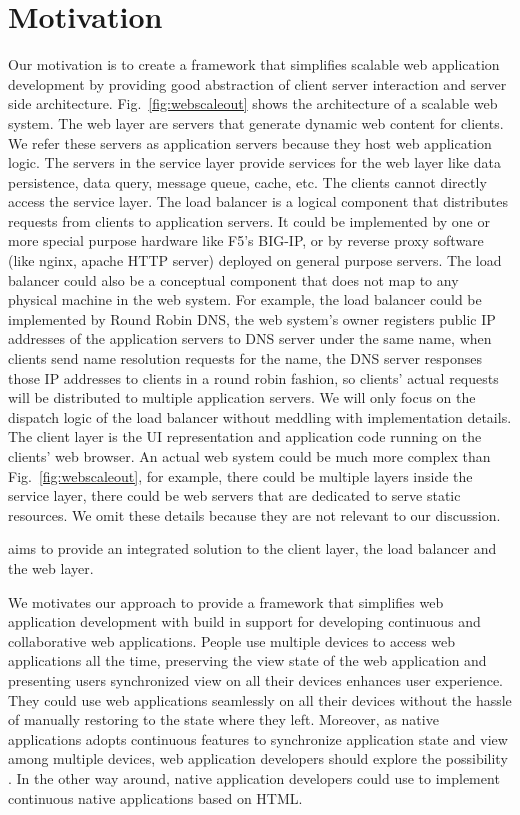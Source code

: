 \section{Motivation}
\label{sec:moti}

Our motivation is to create a framework that simplifies scalable web application
development by providing good abstraction of client server interaction and 
server side architecture.
Fig.~\ref{fig:webscaleout} shows the architecture of a scalable web system.
The web layer are servers that generate dynamic web content for clients.
We refer these servers as application servers because they host web application
logic.
The servers in the service layer provide services for the web layer
like data persistence, data query, message queue, cache, etc. 
The clients cannot directly access the service layer.
The load balancer is a logical component that 
distributes requests from clients to application servers.
It could be implemented by one or more special purpose hardware like F5's BIG-IP,
or by reverse proxy software (like nginx, apache HTTP server) deployed on general
purpose servers.
The load balancer could also be a conceptual component that does not map to 
any physical machine in the web system.
For example, 
the load balancer could be implemented by Round Robin DNS,
the web system's owner registers public IP addresses of the application servers
to DNS server under the same name,
when clients send name resolution requests for the name,
the DNS server responses those IP addresses to clients in a round robin fashion,
so clients' actual requests will be distributed to multiple application servers.
We will only focus on the dispatch logic of the load balancer without meddling with
implementation details.
The client layer is the UI representation and application code running on the
clients' web browser.
An actual web system could be much more complex than Fig.~\ref{fig:webscaleout},
for example, there could be multiple layers inside the service layer,
there could be web servers that are dedicated to serve static resources.
We omit these details because they are not relevant to our discussion.



\cb{} aims to provide an integrated solution to the client layer, the load balancer 
and the web layer.


We motivates our approach to 
provide a framework that simplifies web application development
with build in support for developing continuous and collaborative web applications.
People use multiple devices to access web applications all the time, 
preserving the view state of the web application and presenting
users synchronized view on all their devices enhances user experience.
They could use web applications seamlessly on all their devices
without the hassle of manually restoring to the state where they left.
Moreover, as native applications adopts continuous features
to synchronize application state and view among multiple devices, 
web application developers should explore the possibility .%
In the other way around, native application developers could use \cb{} to 
implement continuous native applications based on HTML.

